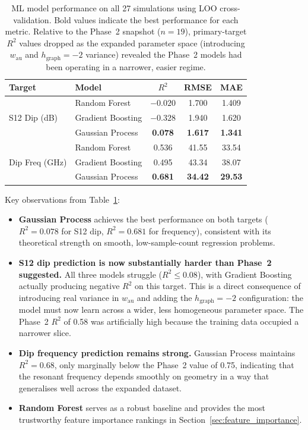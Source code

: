 \documentclass[12pt,a4paper]{report}
\begin{document}
\begin{table}[H]
    \centering
    \caption{ML model performance on all 27 simulations using LOO cross-validation. Bold values indicate the best performance for each metric. Relative to the Phase~2 snapshot ($n=19$), primary-target $R^2$ values dropped as the expanded parameter space (introducing $w_{\text{au}}$ and $h_{\text{graph}}=-2$ variance) revealed the Phase~2 models had been operating in a narrower, easier regime.}
    \label{tab:ml_all}
    \begin{tabular}{ll|ccc}
        \toprule
        Target & Model & $R^2$ & RMSE & MAE \\
        \midrule
        \multirow{3}{*}{S12 Dip (dB)}
        & Random Forest     & $-0.020$ & 1.700 & 1.409 \\
        & Gradient Boosting & $-0.328$ & 1.940 & 1.620 \\
        & Gaussian Process  & \textbf{0.078} & \textbf{1.617} & \textbf{1.341} \\
        \midrule
        \multirow{3}{*}{Dip Freq (GHz)}
        & Random Forest     & 0.536 & 41.55 & 33.54 \\
        & Gradient Boosting & 0.495 & 43.34 & 38.07 \\
        & Gaussian Process  & \textbf{0.681} & \textbf{34.42} & \textbf{29.53} \\
        \bottomrule
    \end{tabular}
\end{table}

Key observations from Table~\ref{tab:ml_all}:
\begin{itemize}[leftmargin=2cm]
    \item \textbf{Gaussian Process} achieves the best performance on both targets ($R^2 = 0.078$ for S12 dip, $R^2 = 0.681$ for frequency), consistent with its theoretical strength on smooth, low-sample-count regression problems.
    \item \textbf{S12 dip prediction is now substantially harder than Phase~2 suggested.} All three models struggle ($R^2 \leq 0.08$), with Gradient Boosting actually producing negative $R^2$ on this target. This is a direct consequence of introducing real variance in $w_{\text{au}}$ and adding the $h_{\text{graph}} = -2$ configuration: the model must now learn across a wider, less homogeneous parameter space. The Phase~2 $R^2$ of 0.58 was artificially high because the training data occupied a narrower slice.
    \item \textbf{Dip frequency prediction remains strong.} Gaussian Process maintains $R^2 = 0.68$, only marginally below the Phase~2 value of 0.75, indicating that the resonant frequency depends smoothly on geometry in a way that generalises well across the expanded dataset.
    \item \textbf{Random Forest} serves as a robust baseline and provides the most trustworthy feature importance rankings in Section~\ref{sec:feature_importance}.
\end{itemize}
\end{document}
